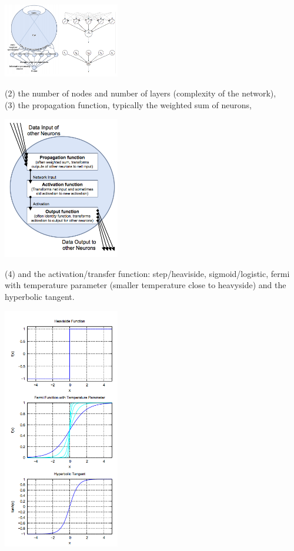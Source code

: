 \documentclass[10pt,landscape]{article}
\begin{document}
\begin{multicols*}{3}
\begin{description}
\begin{minipage}{\linewidth}
    \centering
    \includegraphics[width=2in]{figures/nntopology.png}
\end{minipage}

(2) the number of nodes and number of layers (complexity of the network), \\
(3) the propagation function, typically the weighted sum of neurons, \\

\begin{minipage}{\linewidth}
    \centering
    \includegraphics[width=2in]{figures/nnfunctions.png}
\end{minipage}

(4) and the activation/transfer function: step/heaviside, sigmoid/logistic,
fermi with temperature parameter (smaller temperature close to heavyside)
and the hyperbolic tangent.

\begin{minipage}{\linewidth}
    \centering
    \includegraphics[width=2in]{figures/nnactivationfn.png}
\end{minipage}


\end{description}
\end{multicols*}
\end{document}
